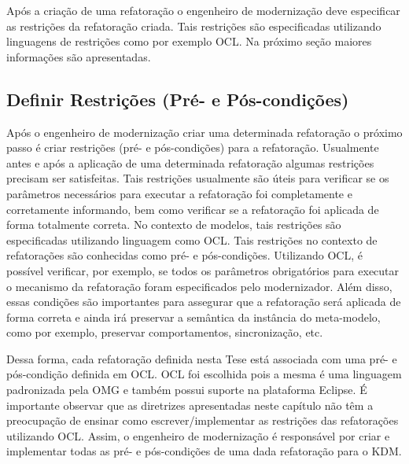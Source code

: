 Após a criação de uma refatoração o engenheiro de modernização deve especificar as restrições da refatoração criada. Tais restrições são especificadas utilizando linguagens de restrições como por exemplo OCL. Na próximo seção maiores informações são apresentadas.

\subsection{Definir Restrições (Pré- e Pós-condições)}\label{sec:linguagem_de_restricao}

Após o engenheiro de modernização criar uma determinada refatoração o próximo passo é criar restrições (pré- e pós-condições) para a refatoração. Usualmente antes e após a aplicação de uma determinada refatoração algumas restrições precisam ser satisfeitas. Tais restrições usualmente são úteis para verificar se os parâmetros necessários para executar a refatoração foi completamente e corretamente informando, bem como verificar se a refatoração foi aplicada de forma totalmente correta. No contexto de modelos, tais restrições são especificadas utilizando linguagem como OCL. Tais restrições no contexto de refatorações são conhecidas como pré- e pós-condições. Utilizando OCL, é possível verificar, por exemplo, se todos os parâmetros obrigatórios para executar o mecanismo da refatoração foram especificados pelo modernizador. Além disso, essas condições são importantes para assegurar que a refatoração será aplicada de forma correta e ainda irá preservar a semântica da instância do meta-modelo, como por exemplo, preservar comportamentos, sincronização, etc. 

Dessa forma, cada refatoração definida nesta Tese está associada com uma pré- e pós-condição definida em OCL. OCL foi escolhida pois a mesma é uma linguagem padronizada pela OMG e também possui suporte na plataforma Eclipse. É importante observar que as diretrizes apresentadas neste capítulo não têm a preocupação de ensinar como escrever/implementar as restrições das refatorações utilizando OCL. Assim, o engenheiro de modernização é responsável por criar e implementar todas as pré- e pós-condições de uma dada refatoração para o KDM.




